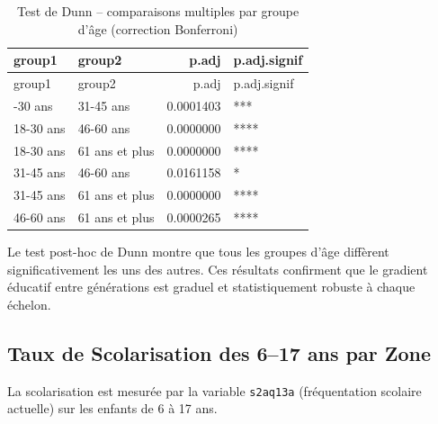 \documentclass[
  11pt,
]{article}
\begin{document}
\begin{longtable}[]{@{}llrl@{}}
\caption{Test de Dunn -- comparaisons multiples par groupe d'âge
(correction Bonferroni)}\tabularnewline
\toprule\noalign{}
group1 & group2 & p.adj & p.adj.signif \\
\midrule\noalign{}
\endfirsthead
\toprule\noalign{}
group1 & group2 & p.adj & p.adj.signif \\
\midrule\noalign{}
\endhead
\bottomrule\noalign{}
\endlastfoot
18-30 ans & 31-45 ans & 0.0001403 & *** \\
18-30 ans & 46-60 ans & 0.0000000 & **** \\
18-30 ans & 61 ans et plus & 0.0000000 & **** \\
31-45 ans & 46-60 ans & 0.0161158 & * \\
31-45 ans & 61 ans et plus & 0.0000000 & **** \\
46-60 ans & 61 ans et plus & 0.0000265 & **** \\
\end{longtable}

Le test post-hoc de Dunn montre que tous les groupes d'âge diffèrent
significativement les uns des autres. Ces résultats confirment que le
gradient éducatif entre générations est graduel et statistiquement
robuste à chaque échelon.

\subsection{Taux de Scolarisation des 6--17 ans par
Zone}\label{taux-de-scolarisation-des-617-ans-par-zone}

La scolarisation est mesurée par la variable \texttt{s2aq13a}
(fréquentation scolaire actuelle) sur les enfants de 6 à 17 ans.
\end{document}
